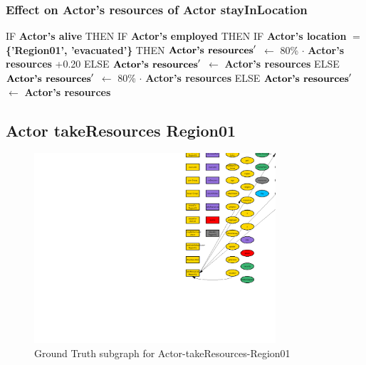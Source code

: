 \documentclass{article}%
\begin{document}
\subsubsection{Effect on Actor's resources of Actor stayInLocation}%
\label{ssubsec:Effect on Actor's resources of Actor stayInLocation}%
\begin{flushleft}%
IF %
\textbf{Actor's alive}%
\linebreak%
\hspace*{2em}%
THEN %
IF %
\textbf{Actor's employed}%
\linebreak%
\hspace*{4em}%
THEN %
IF %
\textbf{Actor's location}%
$=$%
\textbf{\{'Region01', 'evacuated'\}}%
\linebreak%
\hspace*{6em}%
THEN %
$\mbox{\textbf{Actor's resources}} '$%
$\leftarrow$%
80\%%
$\cdot$%
\textbf{Actor's resources}%
+0.20%
\linebreak%
\hspace*{6em}%
ELSE %
$\mbox{\textbf{Actor's resources}} '$%
$\leftarrow$%
\textbf{Actor's resources}%
\linebreak%
\hspace*{4em}%
ELSE %
$\mbox{\textbf{Actor's resources}} '$%
$\leftarrow$%
80\%%
$\cdot$%
\textbf{Actor's resources}%
\linebreak%
\hspace*{2em}%
ELSE %
$\mbox{\textbf{Actor's resources}} '$%
$\leftarrow$%
\textbf{Actor's resources}%
\end{flushleft}

%
\subsection{Actor takeResources Region01}%
\label{subsec:Actor takeResources Region01}%


\begin{figure}[ht]%
\centering%
\includegraphics[width=0.8\textwidth]{images/Actor-takeResources-Region01.png}%
\caption{Ground Truth subgraph for Actor{-}takeResources{-}Region01}%
\end{figure}
\end{document}
